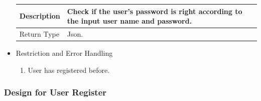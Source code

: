 \documentclass[16pt]{scrreprt}
\begin{document}
\begin{itemize}
\begin{center}
\begin{tabular}{p{5cm}p{10cm}}
        \hline
        Description & Check if the user's password is right according to the input user name and password.\\
        \hline
        Return Type & Json.\\
        \hline
    \end{tabular}
\end{center}
\item Restriction and Error Handling\\
\begin{enumerate}
    \item User has registered before.
\end{enumerate} 
\end{itemize}

\subsubsection{Design for User Register}
\end{document}
